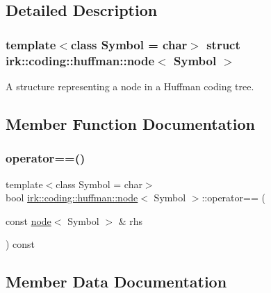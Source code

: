 \subsection{Detailed Description}
\subsubsection*{template$<$class Symbol = char$>$\newline
struct irk\+::coding\+::huffman\+::node$<$ Symbol $>$}

A structure representing a node in a Huffman coding tree. 

\subsection{Member Function Documentation}
\mbox{\label{structirk_1_1coding_1_1huffman_1_1node_a4e0666381a95883e54e9a952aefd3a31}} 
\subsubsection{\texorpdfstring{operator==()}{operator==()}}
{\footnotesize\ttfamily template$<$class Symbol = char$>$ \\
bool \mbox{\hyperlink{structirk_1_1coding_1_1huffman_1_1node}{irk\+::coding\+::huffman\+::node}}$<$ Symbol $>$\+::operator== (\begin{DoxyParamCaption}\item[{const \mbox{\hyperlink{structirk_1_1coding_1_1huffman_1_1node}{node}}$<$ Symbol $>$ \&}]{rhs }\end{DoxyParamCaption}) const\hspace{0.3cm}{\ttfamily [inline]}}



\subsection{Member Data Documentation}
\mbox{\label{structirk_1_1coding_1_1huffman_1_1node_ae303f67bca534f5fcbf2a64a586cd7a9}} 
